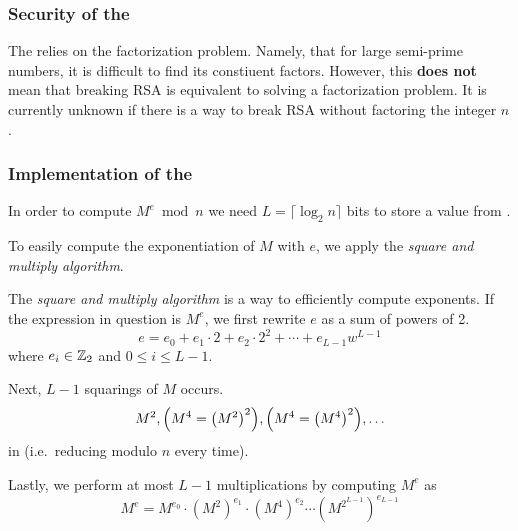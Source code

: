 \subsubsection{Security of the }\label{subsubsec:RSA_Encryption_Scheme-Security}
The  relies on the factorization problem.
Namely, that for large semi-prime numbers, it is difficult to find its constiuent  factors.
However, this \textbf{does not} mean that breaking RSA is equivalent to solving a factorization problem.
It is currently unknown if there is a way to break RSA without factoring the integer $n$.

\subsubsection{Implementation of the }\label{subsubsec:RSA_Encryption_Scheme-Implementation}
In order to compute $M^{e} \bmod n$ we need $L = \lceil \log_{2} n \rceil$ bits to store a value from .

To easily compute the exponentiation of $M$ with $e$, we apply the \emph{square and multiply algorithm}.
\begin{definition}\label{def:Square_Multiply_Algorithm}
  The \emph{square and multiply algorithm} is a way to efficiently compute exponents.
  If the expression in question is $M^{e}$, we first rewrite $e$ as a sum of powers of 2.
  \begin{equation*}
    e = e_{0} + e_{1} \cdot 2 + e_{2} \cdot 2^{2} + \cdots + e_{L-1} w^{L-1}
  \end{equation*}
  where $e_{i} \in \operatorname{\mathbb{Z}}_{2}$ and $0 \leq i \leq L-1$.

  Next, $L-1$ squarings of $M$ occurs.
  \begin{equation*}
    M^{2}, \Bigl( M^{4} = {\left( M^{2} \right)}^{2} \Bigr), \Bigl( M^{4} = {\left( M^{4} \right)}^{2} \Bigr), \ldots
  \end{equation*}
  in  (i.e.\ reducing modulo $n$ every time).

  Lastly, we perform at most $L-1$ multiplications by computing $M^{e}$ as
  \begin{equation*}
    M^{e} = M^{e_{0}} \cdot {\left( M^{2} \right)}^{e_{1}} \cdot {\left( M^{4} \right)}^{e_{2}} \cdots {\left( M^{2^{L-1}} \right)}^{e_{L-1}}
  \end{equation*}
\end{definition}

